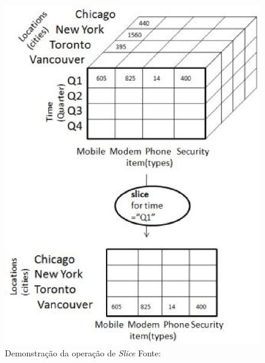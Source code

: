  \begin{figure}[!htb]
 	\centering
 		\includegraphics[scale=0.7]{figuras/dw-slice}
 		\caption{Demonstração da operação de \emph{Slice}    Fonte: \cite{TutorialsPoint}}
 		\label{fig-dw-slice}
 \end{figure}

